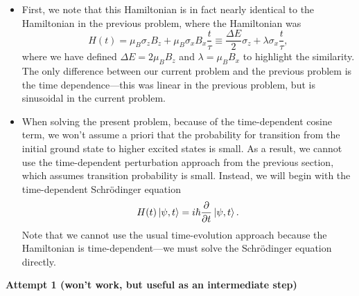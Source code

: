 \documentclass[11pt, a4paper]{article}
\newcommand{\Schro}{Schr\"{o}dinger\xspace}
\newcommand{\Ham}{Hamiltonian\xspace}
\newcommand{\p}{\psi}  %
\begin{document}
\begin{itemize}
	\item First, we note that this \Ham is in fact nearly identical to the \Ham in the previous problem, where the \Ham was
    \begin{equation*}
        H(t) = \mu_{B}\sigma_{z}B_{z} + \mu_{B}\sigma_{x}B_{x}\frac{t}{\tau} \equiv \frac{\Delta E}{2} \sigma_{z} + \lambda \sigma_{x} \frac{t}{\tau},
    \end{equation*}
    where we have defined $ \Delta E = 2\mu_{B}B_{z} $ and $ \lambda = \mu_{B}B_{x} $ to highlight the similarity. The only difference between our current problem and the previous problem is the time dependence---this was linear in the previous problem, but is sinusoidal in the current problem.

	

	\item When solving the present problem, because of the time-dependent cosine term, we won't assume a priori that the probability for transition from the initial ground state to higher excited states is small. As a result, we cannot use the time-dependent perturbation approach from the previous section, which assumes transition probability is small. Instead, we will begin with the time-dependent \Schro equation
	\begin{equation*}
		H(t) \ket{\p, t} = i \hbar \pdv{t}\ket{\p, t}.
	\end{equation*}
	Note that we cannot use the usual time-evolution approach because the \Ham is time-dependent---we must solve the \Schro equation directly.
\end{itemize}
\textbf{Attempt 1 (won't work, but useful as an intermediate step)}
\end{document}
